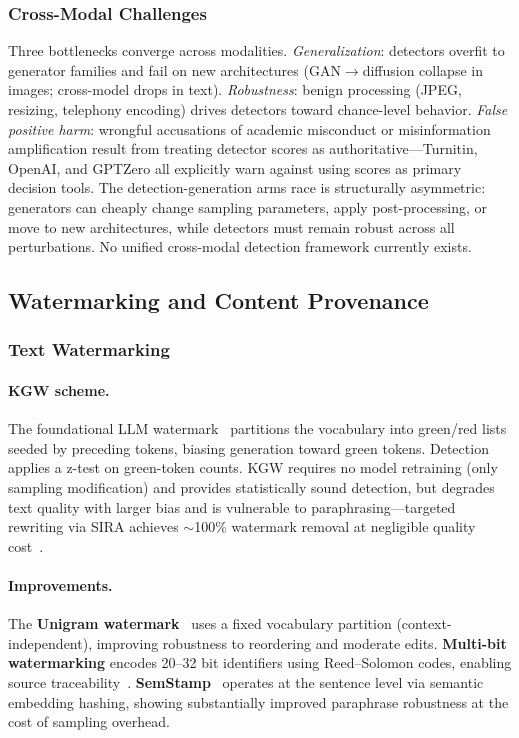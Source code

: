 \subsubsection{Cross-Modal Challenges}
\label{sec:detect-cross}

Three bottlenecks converge across modalities. \emph{Generalization}: detectors overfit to generator families and fail on new architectures (GAN$\to$diffusion collapse in images; cross-model drops in text). \emph{Robustness}: benign processing (JPEG, resizing, telephony encoding) drives detectors toward chance-level behavior. \emph{False positive harm}: wrongful accusations of academic misconduct or misinformation amplification result from treating detector scores as authoritative---Turnitin, OpenAI, and GPTZero all explicitly warn against using scores as primary decision tools. The detection-generation arms race is structurally asymmetric: generators can cheaply change sampling parameters, apply post-processing, or move to new architectures, while detectors must remain robust across all perturbations. No unified cross-modal detection framework currently exists.


\subsection{Watermarking and Content Provenance}
\label{sec:watermark}

\subsubsection{Text Watermarking}
\label{sec:wm-text}

\paragraph{KGW scheme.}
The foundational LLM watermark~\cite{kirchenbauer2023kgw} partitions the vocabulary into green/red lists seeded by preceding tokens, biasing generation toward green tokens. Detection applies a z-test on green-token counts. KGW requires no model retraining (only sampling modification) and provides statistically sound detection, but degrades text quality with larger bias and is vulnerable to paraphrasing---targeted rewriting via SIRA achieves $\sim$100\% watermark removal at negligible quality cost~\cite{cheng2025sira}.

\paragraph{Improvements.}
The \textbf{Unigram watermark}~\cite{zhao2023unigram} uses a fixed vocabulary partition (context-independent), improving robustness to reordering and moderate edits. \textbf{Multi-bit watermarking} encodes 20--32 bit identifiers using Reed--Solomon codes, enabling source traceability~\cite{qu2024multibit}. \textbf{SemStamp}~\cite{hou2023semstamp} operates at the sentence level via semantic embedding hashing, showing substantially improved paraphrase robustness at the cost of sampling overhead.

